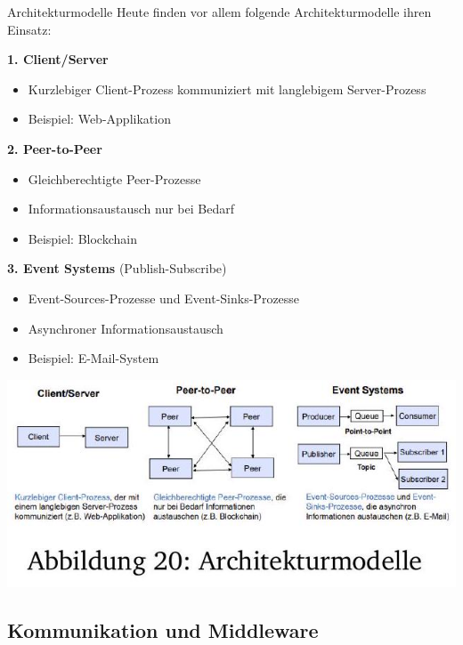 \begin{definition}{Architekturmodelle}
Heute finden vor allem folgende Architekturmodelle ihren Einsatz:

\textbf{1. Client/Server}
\begin{itemize}
    \item Kurzlebiger Client-Prozess kommuniziert mit langlebigem Server-Prozess
    \item Beispiel: Web-Applikation
\end{itemize}

\textbf{2. Peer-to-Peer}
\begin{itemize}
    \item Gleichberechtigte Peer-Prozesse
    \item Informationsaustausch nur bei Bedarf
    \item Beispiel: Blockchain
\end{itemize}

\textbf{3. Event Systems} (Publish-Subscribe)
\begin{itemize}
    \item Event-Sources-Prozesse und Event-Sinks-Prozesse
    \item Asynchroner Informationsaustausch
    \item Beispiel: E-Mail-System
\end{itemize}

\includegraphics[width=\linewidth]{images/2024_12_29_0d1d7b5551ea1b4b41bdg-18}
\end{definition}

\subsection{Kommunikation und Middleware}

